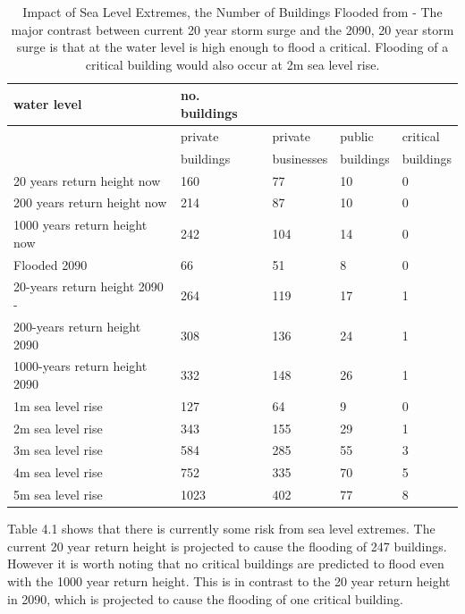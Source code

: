 \begin{table}[h]
    \centering
    \begin{tabular}{|l|l|l|l|l|}
    \hline
        water level & no. buildings  & ~ & ~ & ~ \\ \hline
        ~ & private & private & public  & critical  \\ \newline
        ~ & buildings & businesses & buildings & buildings \\ \hline        
        20 years return height now & 160 & 77 & 10 & 0 \\ \hline
        200 years return height now & 214 & 87 & 10 & 0 \\ \hline
        1000 years return height now & 242 & 104 & 14 & 0 \\ \hline
        Flooded 2090 & 66 & 51 & 8 & 0 \\ \hline
        20-years return height 2090 -& 264 & 119 & 17 & 1 \\ \hline
        200-years return height  2090 & 308 & 136 & 24 & 1 \\ \hline
        1000-years return height  2090 & 332 & 148 & 26 & 1 \\ \hline
        1m sea level rise & 127 & 64 & 9 & 0 \\ \hline
        2m sea level rise & 343 & 155 & 29 & 1 \\ \hline
        3m sea level rise & 584 & 285 & 55 & 3 \\ \hline
        4m sea level rise & 752 & 335 & 70 & 5 \\ \hline
        5m sea level rise & 1023 & 402 & 77 & 8 \\ \hline
    \end{tabular}
    \caption{Impact of Sea Level Extremes, the Number of Buildings Flooded from \cite{kartverket_se_2021} - The major contrast between current 20 year storm surge and the 2090, 20 year storm surge is that at the water level is high enough to flood a critical. Flooding of a critical building would also occur at 2m sea level rise.}
    \label{building-impact-sle}
\end{table}


Table 4.1 shows that there is currently some risk from sea level extremes. The current 20 year return height is projected to cause the flooding of 247 buildings. However it is worth noting that no critical buildings are predicted to flood even with the 1000 year return height. This is in contrast to the 20 year return height in 2090, which is projected to cause the flooding of one critical building.
